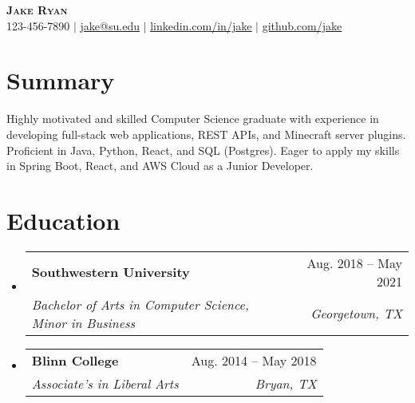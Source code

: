 \documentclass[letterpaper,11pt]{article}
\makeatletter
\newcommand{\resumeSubheading}[4]{
\vspace{-2pt}\item
\begin{tabular*}{0.97\textwidth}[t]{l@{\extracolsep{\fill}}r}
\textbf{#1} & #2 \\
\textit{\small#3} & \textit{\small #4} \\
\end{tabular*}\vspace{-7pt}
}
\newcommand{\resumeSubHeadingListStart}{\begin{itemize}[leftmargin=0.15in, label={}]}
\newcommand{\resumeSubHeadingListEnd}{\end{itemize}}
\makeatother
\begin{document}
\begin{center}
\textbf{\Huge \scshape Jake Ryan} \\ \vspace{1pt}
\small 123-456-7890 $|$ \href{mailto:jake@su.edu}{\underline{jake@su.edu}} $|$
\href{https://linkedin.com/in/jake}{\underline{linkedin.com/in/jake}} $|$
\href{https://github.com/jake}{\underline{github.com/jake}}
\end{center}


\section{Summary}
Highly motivated and skilled Computer Science graduate with experience in developing full-stack web applications, REST APIs, and Minecraft server plugins. Proficient in Java, Python, React, and SQL (Postgres). Eager to apply my skills in Spring Boot, React, and AWS Cloud as a Junior Developer.

\section{Education}
\resumeSubHeadingListStart
\resumeSubheading{Southwestern University}{Aug. 2018 – May 2021}{Bachelor of Arts in Computer Science, Minor in Business}{Georgetown, TX}
\resumeSubheading{Blinn College}{Aug. 2014 – May 2018}{Associate’s in Liberal Arts}{Bryan, TX}
\resumeSubHeadingListEnd
\end{document}
